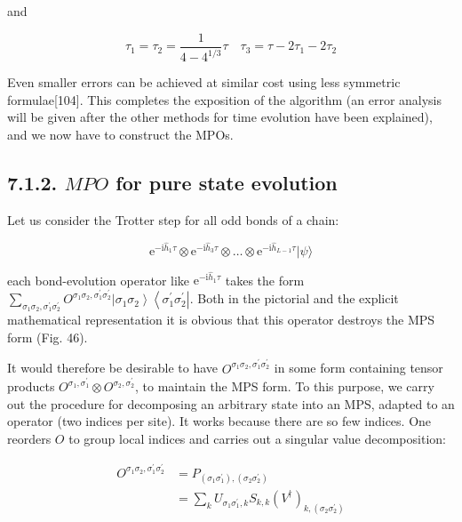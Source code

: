 \documentclass[12pt]{article}
\begin{document}
and


\begin{equation*}
\tau_{1}=\tau_{2}=\frac{1}{4-4^{1 / 3}} \tau \quad \tau_{3}=\tau-2 \tau_{1}-2 \tau_{2} \tag{232}
\end{equation*}


Even smaller errors can be achieved at similar cost using less symmetric formulae[104]. This completes the exposition of the algorithm (an error analysis will be given after the other methods for time evolution have been explained), and we now have to construct the MPOs.

\subsection*{7.1.2. $M P O$ for pure state evolution}
Let us consider the Trotter step for all odd bonds of a chain:


\begin{equation*}
\mathrm{e}^{-\mathrm{i} \hat{h}_{1} \tau} \otimes \mathrm{e}^{-\mathrm{i} \hat{h}_{3} \tau} \otimes \ldots \otimes \mathrm{e}^{-\mathrm{i} \hat{h}_{L-1} \tau}|\psi\rangle \tag{233}
\end{equation*}


each bond-evolution operator like $\mathrm{e}^{-\mathrm{i} \hat{h}_{1} \tau}$ takes the form $\sum_{\sigma_{1} \sigma_{2}, \sigma_{1}^{\prime} \sigma_{2}^{\prime}} O^{\sigma_{1} \sigma_{2}, \sigma_{1}^{\prime} \sigma_{2}^{\prime}}\left|\sigma_{1} \sigma_{2}\right\rangle\left\langle\sigma_{1}^{\prime} \sigma_{2}^{\prime}\right|$. Both in the pictorial and the explicit mathematical representation it is obvious that this operator destroys the MPS form (Fig. 46).

It would therefore be desirable to have $O^{\sigma_{1} \sigma_{2}, \sigma_{1}^{\prime} \sigma_{2}^{\prime}}$ in some form containing tensor products $O^{\sigma_{1}, \sigma_{1}^{\prime}} \otimes O^{\sigma_{2}, \sigma_{2}^{\prime}}$, to maintain the MPS form. To this purpose, we carry out the procedure for decomposing an arbitrary state into an MPS, adapted to an operator (two indices per site). It works because there are so few indices. One reorders $O$ to group local indices and carries out a singular value decomposition:

$$
\begin{aligned}
O^{\sigma_{1} \sigma_{2}, \sigma_{1}^{\prime} \sigma_{2}^{\prime}} & =P_{\left(\sigma_{1} \sigma_{1}^{\prime}\right),\left(\sigma_{2} \sigma_{2}^{\prime}\right)} \\
& =\sum_{k} U_{\sigma_{1} \sigma_{1}^{\prime}, k} S_{k, k}\left(V^{\dagger}\right)_{k,\left(\sigma_{2} \sigma_{2}^{\prime}\right)}
\end{aligned}
$$
\end{document}
